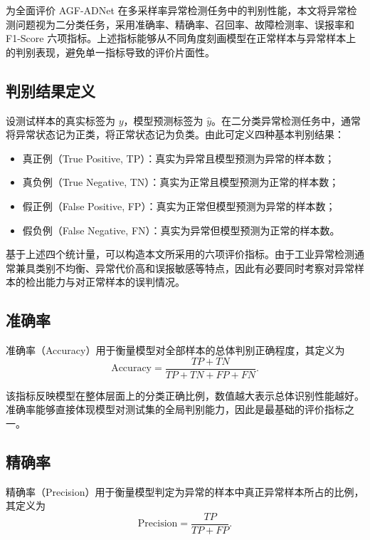 \documentclass[bachelor, vlined]{DissertUESTC}
\begin{document}
    为全面评价 AGF-ADNet 在多采样率异常检测任务中的判别性能，本文将异常检测问题视为二分类任务，采用准确率、精确率、召回率、故障检测率、误报率和 F1-Score 六项指标。上述指标能够从不同角度刻画模型在正常样本与异常样本上的判别表现，避免单一指标导致的评价片面性。
    
    \subsection{判别结果定义}
    
    设测试样本的真实标签为 $y$，模型预测标签为 $\hat{y}$。在二分类异常检测任务中，通常将异常状态记为正类，将正常状态记为负类。由此可定义四种基本判别结果：
    \begin{itemize}
        \item 真正例（True Positive, TP）：真实为异常且模型预测为异常的样本数；
        \item 真负例（True Negative, TN）：真实为正常且模型预测为正常的样本数；
        \item 假正例（False Positive, FP）：真实为正常但模型预测为异常的样本数；
        \item 假负例（False Negative, FN）：真实为异常但模型预测为正常的样本数。
    \end{itemize}
    
    基于上述四个统计量，可以构造本文所采用的六项评价指标。由于工业异常检测通常兼具类别不均衡、异常代价高和误报敏感等特点，因此有必要同时考察对异常样本的检出能力与对正常样本的误判情况。
    
    \subsection{准确率}
    
    准确率（Accuracy）用于衡量模型对全部样本的总体判别正确程度，其定义为
    \begin{equation}
        \mathrm{Accuracy}
        =
        \frac{TP + TN}{TP + TN + FP + FN}.
    \end{equation}
    
    该指标反映模型在整体层面上的分类正确比例，数值越大表示总体识别性能越好。准确率能够直接体现模型对测试集的全局判别能力，因此是最基础的评价指标之一。
    
    \subsection{精确率}
    
    精确率（Precision）用于衡量模型判定为异常的样本中真正异常样本所占的比例，其定义为
    \begin{equation}
        \mathrm{Precision}
        =
        \frac{TP}{TP + FP}.
    \end{equation}
    
\end{document}
